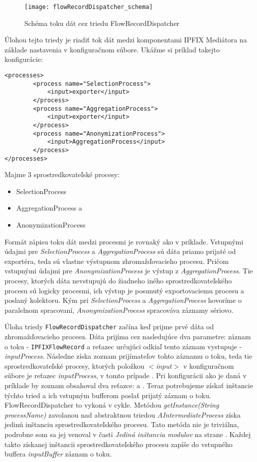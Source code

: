 \begin{figure}[ht!]
\centering
\texttt{[image: flowRecordDispatcher\_schema]}
\caption{Schéma toku dát cez triedu FlowRecordDispatcher}\label{o:flowRecordDispatcher_schema}
\end{figure}

Úlohou tejto triedy je riadiť tok dát medzi komponentami IPFIX Mediátora na základe nastavenia v 
konfiguračnom súbore.
Ukážme si príklad takejto konfigurácie:
\begin{verbatim}
<processes>
        <process name="SelectionProcess">
            <input>exporter</input>
        </process>
        <process name="AggregationProcess">
            <input>exporter</input>
        </process>
        <process name="AnonymizationProcess">
            <input>AggregationProcess</input>
        </process>
</processes>
\end{verbatim}

Majme 3 sprostredkovateľské procesy: 
\begin{itemize}
\item SelectionProcess
\item AggregationProcess a 
\item AnonymizationProcess 
\end{itemize}

Formát zápisu toku dát medzi procesmi je rovnaký ako v príklade. Vstupnými údajmi pre 
\emph{SelectionProcess} a \emph{AggregationProcess} sú dáta priamo prijaté od exportéra, teda sú 
vlastne výstupnom  
zhromažďovacieho procesu. Pričom vstupnými údajmi pre \emph{AnonymizationProcess} je výstup 
z \emph{AggregationProcess}. Tie procesy, ktorých dáta nevstupujú do žiadneho iného sprostredkovateľského 
procesu sú logicky  procesmi, ich výstup je posunutý exportovaciemu procesu a poslaný 
kolektoru. Kým pri \emph{SelectionProcess} a \emph{AggregationProcess} hovoríme o paralelnom spracovaní, 
\emph{AnonymizationProcess} spracováva záznamy sériovo.

Úloha triedy \verb|FlowRecordDispatcher| začína keď prijme prvé dáta od zhromažďovacieho procesu. Dáta prijíma 
cez nasledujúce dva 
parametre: záznam o toku - \verb|IPFIXFlowRecord| a reťazec určujúci odkiaľ tento záznam vystupuje - 
\emph{inputProcess}.
Následne získa zoznam prijímateľov tohto záznamu o toku, teda tie sprostredkovateľské procesy, 
ktorých položkou \emph{$<$input$>$} v konfiguračnom súbore je reťazec \emph{inputProcess}, v tomto 
prípade . Pri konfigurácii ako je daná v príklade by zoznam obsahoval dva reťazce: 
 a . Teraz potrebujeme získať inštancie týchto tried a ich vstupným bufferom poslať 
prijatý záznam o toku. FlowRecordDispatcher to vykoná v cykle. 
Metódou \emph{getInstance(String processName)} zavolanou nad
abstraktnou triedou \emph{AIntermediateProcess} získa jedinú inštanciu sprostredkovateľského procesu. 
Tato metóda nie je triviálna, podrobne som sa jej venoval v časti 
\emph{Jediná inštancia modulov} na strane \pageref{sec:singleton}. Každej takto získanej 
inštancii sprostredkovateľského procesu zapíše do vstupného buffera \emph{inputBuffer} záznam o toku.

